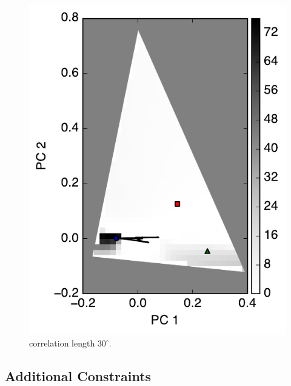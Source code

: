 \documentclass[iop,numberedappendix,apj,]{emulateapj}
\begin{document}
\begin{figure}[tbh!]
\begin{center}
\includegraphics[width=\hsize]{mockdata_90deg_3types_t12_lc_reg.pdf}
    \end{center}
    \caption{correlation length $30^{\circ }$. }
\label{fig:noreg}
\end{figure}


\subsection{Additional Constraints}
\label{ss:regularization}






\end{document}

